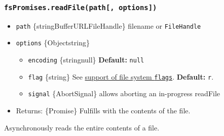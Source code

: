 \begin{Shaded}
\begin{Highlighting}[]
 \OperatorTok{;}

\NormalTok{ \{}
  \OperatorTok{=}  \OperatorTok{;}
  \NormalTok{ (}
    \OperatorTok{;}
\NormalTok{\} }
  \OperatorTok{;}
\NormalTok{\}}
\end{Highlighting}
\end{Shaded}

\subsubsection{\texorpdfstring{\texttt{fsPromises.readFile(path{[},\ options{]})}}{fsPromises.readFile(path{[}, options{]})}}\label{fspromises.readfilepath-options}

\begin{itemize}
\tightlist
\item
  \texttt{path} \{string\textbar Buffer\textbar URL\textbar FileHandle\}
  filename or \texttt{FileHandle}
\item
  \texttt{options} \{Object\textbar string\}

  \begin{itemize}
  \tightlist
  \item
    \texttt{encoding} \{string\textbar null\} \textbf{Default:}
    \texttt{null}
  \item
    \texttt{flag} \{string\} See \hyperref[file-system-flags]{support of
    file system \texttt{flags}}. \textbf{Default:}
    \texttt{\textquotesingle{}r\textquotesingle{}}.
  \item
    \texttt{signal} \{AbortSignal\} allows aborting an in-progress
    readFile
  \end{itemize}
\item
  Returns: \{Promise\} Fulfills with the contents of the file.
\end{itemize}

Asynchronously reads the entire contents of a file.


